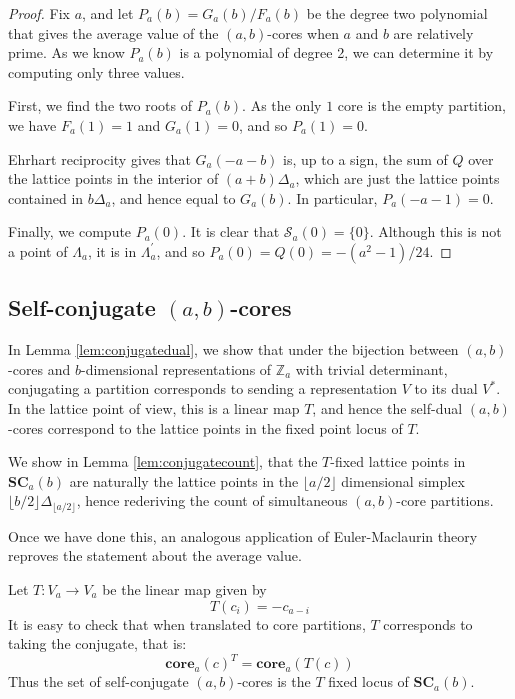 \documentclass{amsart}[12pt]
\theoremstyle{definition}
\newcommand{\Z}{\mathbb{Z}}
\newcommand{\core}{\mathbf{core}}
\newcommand{\SC}{\mathbf{SC}}
\begin{document}
\begin{proof}

Fix $a$, and let $P_a(b)=G_a(b)/F_a(b)$ be the degree two polynomial that
gives the average value of the $(a,b)$-cores when $a$ and $b$ are
relatively prime.  As we know $P_a(b)$ is a polynomial of degree 2, we can determine it by computing only three values.

First, we find the two roots of $P_a(b)$.  As the only $1$ core is the empty partition, we have $F_a(1)=1$ and $G_a(1)=0$, and so $P_a(1)=0$.

Ehrhart reciprocity gives that $G_a(-a-b)$ is, up to a sign, the sum of $Q$ over the lattice points in the interior of $(a+b)\Delta_a$, which are just the lattice points contained in $b\Delta_a$, and hence equal to $G_a(b)$.  In particular, $P_a(-a-1)=0$.  

Finally, we compute $P_a(0)$.  It is clear that $\mathcal{S}_a(0)=\{0\}$.  Although this is not a point of $\Lambda_a$, it is in $\Lambda_a^\prime$, and so $P_a(0)=Q(0)=-(a^2-1)/24$.
\end{proof}

\subsection{Self-conjugate \texorpdfstring{$(a,b)$}{(a,b)}-cores} \label{sec:conjugate}

In Lemma \ref{lem:conjugatedual}, we show that under the bijection between $(a,b)$-cores and $b$-dimensional representations of $\Z_a$ with trivial determinant, conjugating a partition corresponds to sending a representation $V$ to its dual $V^*$.  In the lattice point of view, this is a linear map $T$, and hence the self-dual $(a,b)$-cores correspond to the lattice points in the fixed point locus of $T$.  

We show in Lemma \ref{lem:conjugatecount}, that the $T$-fixed lattice points in $\SC_a(b)$ are naturally the lattice points in the $\lfloor a/2\rfloor$ dimensional simplex $\lfloor b/2\rfloor \Delta_{\lfloor a/2\rfloor}$, hence rederiving the count of simultaneous $(a,b)$-core partitions.  

Once we have done this, an analogous application of Euler-Maclaurin theory reproves the statement about the average value.

Let $T:V_a\to V_a$ be the linear map given by
$$T(c_i)=-c_{a-i}$$
It is easy to check that when translated to core partitions, $T$ corresponds to taking the conjugate, that is: $$\core_a(c)^T=\core_a(T(c))$$
Thus the set of self-conjugate $(a,b)$-cores is the $T$ fixed locus of $\SC_a(b)$.  
\end{document}
